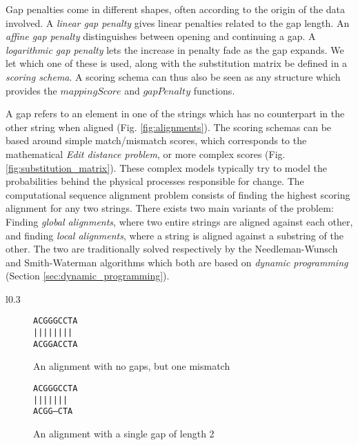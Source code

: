 \documentclass[thesis.tex]{subfiles}
\begin{document}
Gap penalties come in different shapes, often according to the origin of the data involved. A \textit{linear gap penalty} gives linear penalties related to the gap length. An \textit{affine gap penalty} distinguishes between opening and continuing a gap. A \textit{logarithmic gap penalty} lets the increase in penalty fade as the gap expands. We let which one of these is used, along with the substitution matrix be defined in a \textit{scoring schema}. A scoring schema can thus also be seen as any structure which provides the $mappingScore$ and $gapPenalty$ functions.\\
\par\noindent
A gap refers to an element in one of the strings which has no counterpart in the other string when aligned (Fig. \ref{fig:alignments}). The scoring schemas can be based around simple match/mismatch scores, which corresponds to the mathematical \textit{Edit distance problem}, or more complex scores (Fig. \ref{fig:substitution_matrix}). These complex models typically try to model the probabilities behind the physical processes responsible for change. The computational sequence alignment problem consists of finding the highest scoring alignment for any two strings. There exists two main variants of the problem: Finding \textit{global alignments}, where two entire strings are aligned against each other, and finding \textit{local alignments}, where a string is aligned against a substring of the other. The two are traditionally solved respectively by the Needleman-Wunsch and Smith-Waterman algorithms which both are based on \textit{dynamic programming} (Section \ref{sec:dynamic_programming}).\\
\par\noindent
\begin{wrapfigure}{l}{0.3\textwidth}
  \begin{mdframed}
    \begin{subfigure}[t]{\textwidth}
      \begin{mdframed}
        \begin{center}
          \texttt{ACGGGCCTA}\\
          \texttt{||||\space||||}\\
          \texttt{ACGGACCTA}
        \end{center}
      \end{mdframed}
      \caption{An alignment with no gaps, but one mismatch}
    \end{subfigure}
    \begin{subfigure}[b]{\textwidth}
      \begin{mdframed}
        \begin{center}
          \texttt{ACGGGCCTA}\\
          \texttt{||||\space\space|||}\\
          \texttt{ACGG---CTA}
        \end{center}
      \end{mdframed}
      \caption{An alignment with a single gap of length 2}
    \end{subfigure}
  \end{mdframed}
  \caption{Examples of aligned text strings}
  \label{fig:alignments}
\end{wrapfigure}
\end{document}
